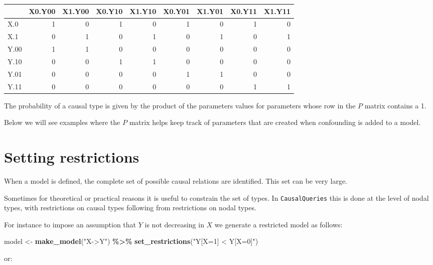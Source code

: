 \documentclass[
  12pt,
]{book}
\newenvironment{Shaded}{\begin{snugshade}}{\end{snugshade}}
\newcommand{\FunctionTok}[1]{\textcolor[rgb]{0.13,0.29,0.53}{\textbf{#1}}}
\newcommand{\NormalTok}[1]{#1}
\newcommand{\OtherTok}[1]{\textcolor[rgb]{0.56,0.35,0.01}{#1}}
\newcommand{\SpecialCharTok}[1]{\textcolor[rgb]{0.81,0.36,0.00}{\textbf{#1}}}
\newcommand{\StringTok}[1]{\textcolor[rgb]{0.31,0.60,0.02}{#1}}
\begin{document}
\begin{tabular}{l|r|r|r|r|r|r|r|r}
\hline
  & X0.Y00 & X1.Y00 & X0.Y10 & X1.Y10 & X0.Y01 & X1.Y01 & X0.Y11 & X1.Y11\\
\hline
X.0 & 1 & 0 & 1 & 0 & 1 & 0 & 1 & 0\\
\hline
X.1 & 0 & 1 & 0 & 1 & 0 & 1 & 0 & 1\\
\hline
Y.00 & 1 & 1 & 0 & 0 & 0 & 0 & 0 & 0\\
\hline
Y.10 & 0 & 0 & 1 & 1 & 0 & 0 & 0 & 0\\
\hline
Y.01 & 0 & 0 & 0 & 0 & 1 & 1 & 0 & 0\\
\hline
Y.11 & 0 & 0 & 0 & 0 & 0 & 0 & 1 & 1\\
\hline
\end{tabular}

The probability of a causal type is given by the product of the parameters values for parameters whose row in the \(P\) matrix contains a 1.

Below we will see examples where the \(P\) matrix helps keep track of parameters that are created when confounding is added to a model.

\hypertarget{restrictions}{%
\section{Setting restrictions}\label{restrictions}}

When a model is defined, the complete set of possible causal relations are identified. This set can be very large.

Sometimes for theoretical or practical reasons it is useful to constrain the set of types. In \texttt{CausalQueries} this is done at the level of nodal types, with restrictions on causal types following from restrictions on nodal types.

For instance to impose an assumption that \(Y\) is not decreasing in \(X\) we generate a restricted model as follows:

\begin{Shaded}
\begin{Highlighting}[]
\NormalTok{model }\OtherTok{\textless{}{-}} \FunctionTok{make\_model}\NormalTok{(}\StringTok{"X{-}\textgreater{}Y"}\NormalTok{) }\SpecialCharTok{\%\textgreater{}\%} \FunctionTok{set\_restrictions}\NormalTok{(}\StringTok{"Y[X=1] \textless{} Y[X=0]"}\NormalTok{)}
\end{Highlighting}
\end{Shaded}

or:
\end{document}
